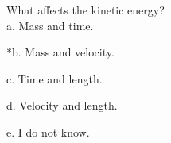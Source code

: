 
What affects the kinetic energy? \\

a. Mass and time.

*b. Mass and velocity.

c. Time and length.

d. Velocity and length.

e. I do not know. \\
